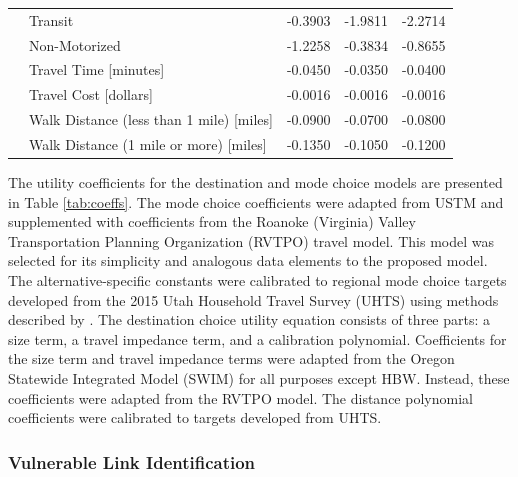 \documentclass[3p, authoryear]{elsarticle} %
\begin{document}
\begin{table}
\begin{tabular}[t]{llrrr}
\hspace{1em} & Transit & -0.3903 & -1.9811 & -2.2714\\

\hspace{1em} & Non-Motorized & -1.2258 & -0.3834 & -0.8655\\

\hspace{1em} & Travel Time [minutes] & -0.0450 & -0.0350 & -0.0400\\

\hspace{1em} & Travel Cost [dollars] & -0.0016 & -0.0016 & -0.0016\\

\hspace{1em} & Walk Distance (less than 1 mile) [miles] & -0.0900 & -0.0700 & -0.0800\\

\hspace{1em} & Walk Distance (1 mile or more) [miles] & -0.1350 & -0.1050 & -0.1200\\
\bottomrule
\end{tabular}
\end{table}

The utility coefficients for the destination and mode choice models are
presented in Table \ref{tab:coeffs}. The mode choice coefficients were adapted
from USTM and supplemented with coefficients from the Roanoke (Virginia)
Valley Transportation Planning Organization (RVTPO) travel model. This model was
selected for its simplicity and analogous data elements to the proposed model.
The alternative-specific constants were calibrated to regional mode choice
targets developed from the 2015 Utah Household Travel Survey (UHTS) using
methods described by \citet{koppelman2006}.
The destination choice utility equation consists of three parts: a size term,
a travel impedance term, and a calibration polynomial. Coefficients for the
size term and travel impedance terms were adapted from the Oregon
Statewide Integrated Model (SWIM) for all purposes except HBW. Instead, these coefficients were
adapted from the RVTPO model. The distance polynomial coefficients were
calibrated to targets developed from UHTS.

\hypertarget{vulnerable-link-identification}{%
\subsubsection{Vulnerable Link Identification}\label{vulnerable-link-identification}}
\end{document}
